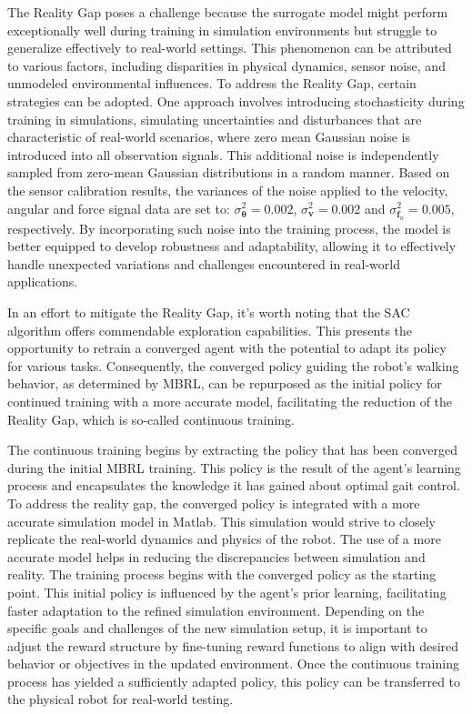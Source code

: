 The Reality Gap poses a challenge because the surrogate model might perform exceptionally well during training in simulation environments but struggle to generalize effectively to real-world settings. This phenomenon can be attributed to various factors, including disparities in physical dynamics, sensor noise, and unmodeled environmental influences. To address the Reality Gap, certain strategies can be adopted. One approach involves introducing stochasticity during training in simulations, simulating uncertainties and disturbances that are characteristic of real-world scenarios, where zero mean Gaussian noise is introduced into all observation signals. This additional noise is independently sampled from zero-mean Gaussian distributions in a random manner. Based on the sensor calibration results, the variances of the noise applied to the velocity, angular and force signal data are set to: $\sigma_{\pmb{\theta}}^2 = 0.002$, $\sigma_{\mathbf{v}}^2 = 0.002$ and $\sigma_{\mathbf{f}_n}^2 = 0.005$, respectively. By incorporating such noise into the training process, the model is better equipped to develop robustness and adaptability, allowing it to effectively handle unexpected variations and challenges encountered in real-world applications.

In an effort to mitigate the Reality Gap, it's worth noting that the SAC algorithm offers commendable exploration capabilities. This presents the opportunity to retrain a converged agent with the potential to adapt its policy for various tasks. Consequently, the converged policy guiding the robot's walking behavior, as determined by MBRL, can be repurposed as the initial policy for continued training with a more accurate model, facilitating the reduction of the Reality Gap, which is so-called continuous training.

The continuous training begins by extracting the policy that has been converged during the initial MBRL training. This policy is the result of the agent's learning process and encapsulates the knowledge it has gained about optimal gait control. To address the reality gap, the converged policy is integrated with a more accurate simulation model in Matlab. This simulation would strive to closely replicate the real-world dynamics and physics of the robot. The use of a more accurate model helps in reducing the discrepancies between simulation and reality. The training process begins with the converged policy as the starting point. This initial policy is influenced by the agent's prior learning, facilitating faster adaptation to the refined simulation environment. Depending on the specific goals and challenges of the new simulation setup, it is important to adjust the reward structure by fine-tuning reward functions to align with desired behavior or objectives in the updated environment. Once the continuous training process has yielded a sufficiently adapted policy, this policy can be transferred to the physical robot for real-world testing. 